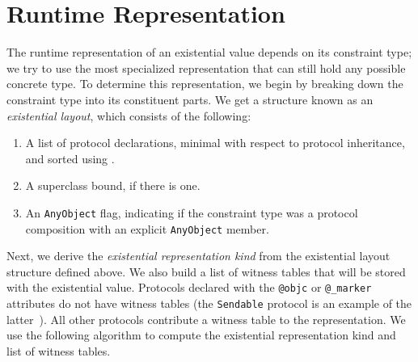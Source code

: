 \documentclass[../generics]{subfiles}
\begin{document}
\section{Runtime Representation}\label{sec:existential representation}

The runtime representation of an existential value depends on its constraint type; we try to use the most specialized representation that can still hold any possible concrete type. To determine this representation, we begin by breaking down the constraint type into its constituent parts. We get a structure known as an \emph{existential layout}, which consists of the following:
\begin{enumerate}
\item A list of protocol declarations, minimal with respect to protocol inheritance, and sorted using .
\item A superclass bound, if there is one.
\item An \texttt{AnyObject} flag, indicating if the constraint type was a protocol composition with an explicit \texttt{AnyObject} member.
\end{enumerate}

Next, we derive the \emph{existential representation kind} from the existential layout structure defined above. We also build a list of witness tables that will be stored with the existential value. Protocols declared with the \verb|@objc| or \verb|@_marker| attributes do not have witness tables (the \texttt{Sendable} protocol is an example of the latter~\cite{se0302}). All other protocols contribute a witness table to the representation. We use the following algorithm to compute the existential representation kind and list of witness tables.
\end{document}
